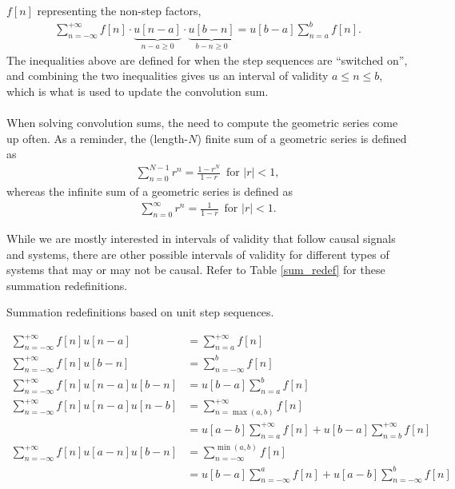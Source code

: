 \documentclass{report}
\begin{document}
$f[n]$ representing the non-step factors, 
\begin{align}
    \sum_{n=-\infty}^{+\infty} f[n] \cdot \underbrace{u[n-a]}_\textrm{$n-a\geq 0$} \cdot \underbrace{u[b-n]}_\textrm{$b-n\geq 0$} = u[b-a]\sum_{n=a}^{b} f[n].
\end{align}
The inequalities above are defined for when the step sequences are ``switched on'', and combining the two inequalities gives us an interval of validity $a\leq n\leq b$, which is what is used to update the convolution sum.
\\ \\
When solving convolution sums, the need to compute the geometric series come up often. As a reminder, the (length-$N$) finite sum of a geometric series is defined as 
\begin{align}
    \sum_{n=0}^{N-1} r^n = \frac{1-r^N}{1-r}\, \text{ for } |r| < 1,
\end{align}
whereas the infinite sum of a geometric series is defined as 
\begin{align}
    \sum_{n=0}^{\infty} r^n = \frac{1}{1-r}\, \text{ for } |r| < 1.
\end{align}

While we are mostly interested in intervals of validity that follow causal signals and systems, there are other possible intervals of validity for different 
types of systems that may or may not be causal. Refer to Table \ref{sum_redef} for these summation redefinitions. 
\begin{table}[hbt!]
    \centering
    \caption{Summation redefinitions based on unit step sequences.}
    \label{sum_redef}
    \begin{mdframed}
    \begin{align}
        \sum_{n=-\infty}^{+\infty} f[n] u[n-a] &= \sum_{n=a}^{+\infty} f[n] \\[0.25cm]
        \sum_{n=-\infty}^{+\infty} f[n] u[b-n] &= \sum_{n=-\infty}^{b} f[n] \\[0.25cm]
        \sum_{n=-\infty}^{+\infty} f[n] u[n-a] u[b-n] &= u[b-a]\sum_{n=a}^{b} f[n] \\[0.25cm]
        \sum_{n=-\infty}^{+\infty} f[n] u[n-a] u[n-b] &= \sum_{n=\max(a,b)}^{+\infty} f[n] \nonumber \\ 
        &= u[a-b] \sum_{n=a}^{+\infty} f[n] + u[b-a] \sum_{n=b}^{+\infty} f[n] \\[0.25cm] 
        \sum_{n=-\infty}^{+\infty} f[n] u[a-n] u[b-n] &= \sum_{n=-\infty}^{\min(a,b)} f[n] \nonumber \\ 
        &= u[b-a] \sum_{n=-\infty}^{a} f[n] + u[a-b] \sum_{n=-\infty}^{b} f[n] \\[0.15cm] \nonumber
    \end{align}
    \end{mdframed}
\end{table} 
\end{document}
